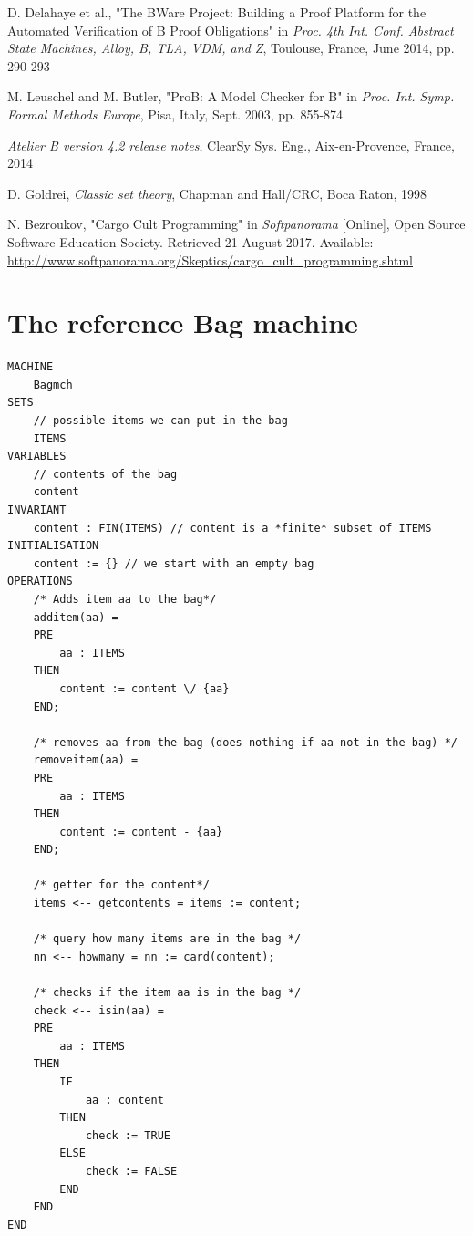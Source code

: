 \documentclass[12pt,journal,duplex]{IEEEtran}
\begin{document}
\begin{thebibliography}{2}
		D. Delahaye et al., "The BWare Project: Building a Proof Platform for the Automated Verification of B Proof Obligations" in \emph{Proc. 4th Int. Conf. Abstract State Machines, Alloy, B, TLA, VDM, and Z}, Toulouse, France, June 2014, pp. 290-293

		M. Leuschel and M. Butler, "ProB: A Model Checker for B" in \emph{Proc. Int. Symp. Formal Methods Europe}, Pisa, Italy, Sept. 2003, pp. 855-874

		\emph{Atelier B version 4.2 release notes}, ClearSy Sys. Eng., Aix-en-Provence, France, 2014

		D. Goldrei, \emph{Classic set theory}, Chapman and Hall/CRC, Boca Raton, 1998

		N. Bezroukov, "Cargo Cult Programming" in \emph{Softpanorama} [Online],  Open Source Software Education Society. Retrieved 21 August 2017. Available: \url{http://www.softpanorama.org/Skeptics/cargo_cult_programming.shtml}










	\end{thebibliography}


	\onecolumn
	\appendices
	\section{The reference Bag machine}
	\begin{lstlisting}
MACHINE
	Bagmch
SETS
	// possible items we can put in the bag
	ITEMS
VARIABLES
	// contents of the bag
	content
INVARIANT
	content : FIN(ITEMS) // content is a *finite* subset of ITEMS
INITIALISATION
	content := {} // we start with an empty bag
OPERATIONS
	/* Adds item aa to the bag*/
	additem(aa) =
	PRE
		aa : ITEMS
	THEN
		content := content \/ {aa}
	END;

	/* removes aa from the bag (does nothing if aa not in the bag) */
	removeitem(aa) =
	PRE
		aa : ITEMS
	THEN
		content := content - {aa}
	END;

	/* getter for the content*/
	items <-- getcontents = items := content;

	/* query how many items are in the bag */
	nn <-- howmany = nn := card(content);

	/* checks if the item aa is in the bag */
	check <-- isin(aa) =
	PRE
		aa : ITEMS
	THEN
		IF
			aa : content
		THEN
			check := TRUE
		ELSE
			check := FALSE
		END
	END
END
\end{lstlisting}
\pagebreak
\end{document}
